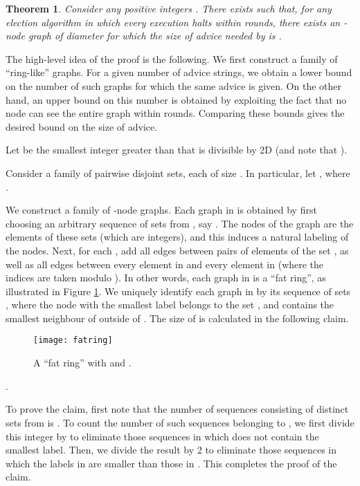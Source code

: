 \documentclass[11pt]{article}
\newtheorem{theorem}{Theorem}[section]
\newcommand{\qed}{\hfill  \bigbreak}
\newenvironment{proof}{\noindent {\bf Proof.}}{\qed}
\begin{document}
\begin{theorem}
Consider any positive integers . There exists  such that, for any election algorithm  in which every execution halts within  rounds, there exists an -node graph of diameter  for which the size of advice needed by  is .
\end{theorem}
\begin{proof}
The high-level idea of the proof is the following. We first construct a family of ``ring-like'' graphs.
For a given number of advice strings, we obtain a lower bound on the number of such graphs for which the same advice is given.
On the other hand, an upper bound on this number is obtained by exploiting the fact that no node can see the entire graph within  rounds. Comparing these bounds gives the desired bound on the size of advice.  


Let  be the smallest integer greater than  that is divisible by 2D (and note that ).


Consider a family  of  pairwise disjoint sets, each of size . In particular, let 
, where
.

We construct a family  of -node graphs. Each graph in  is obtained by first choosing an arbitrary sequence of  sets from , say . The nodes of the graph are the elements of these sets (which are integers),
and this induces a natural labeling of the nodes. Next,
for each , add all edges between pairs of elements of the set , as well as all edges between every element in  and 
every element in  (where the indices are taken modulo ). 
In other words, each graph in  is a ``fat ring'', as illustrated in Figure \ref{fatring}. 
We uniquely identify each graph in  by its sequence of sets , where the node  with the smallest label belongs to the set ,
 and  contains the smallest neighbour of  outside of . The size of  is calculated in the following claim.
 
\begin{figure}[!ht]
\begin{center}
\texttt{[image: fatring]}
\end{center}
\caption{A ``fat ring'' with  and .}
\label{fatring}
\end{figure}

\vspace{3mm} 
 .
\vspace{3mm}

To prove the claim, first note that the number of sequences  consisting of  distinct sets from  is . To count the number of such sequences belonging to , we first divide this integer by  to eliminate those sequences in which  does not contain the smallest label. Then, we divide the result by 2 to eliminate those sequences in which the labels in  are smaller than those in . This completes the proof of the claim.



\end{proof}
\end{document}
